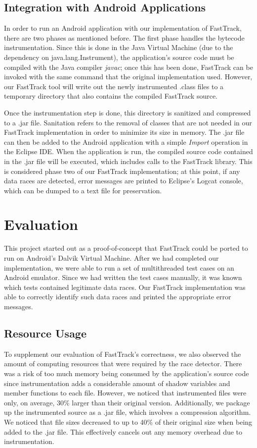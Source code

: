 \documentclass{acm_proc_article-sp}
\begin{document}
\subsection{Integration with Android Applications}
In order to run an Android application with our implementation of FastTrack, there are two phases as mentioned before. The first phase handles the bytecode instrumentation. Since this is done in the Java Virtual Machine (due to the dependency on java.lang.Instrument), the application's source code must be compiled with the Java compiler \emph{javac}; once this has been done, FastTrack can be invoked with the same command that the original implementation used. However, our FastTrack tool will write out the newly instrumented .class files to a temporary directory that also contains the compiled FastTrack source. 

Once the instrumentation step is done, this directory is sanitized and compressed to a .jar file.  Sanitation refers to the removal of classes that are not needed in our FastTrack implementation in order to minimize its size in memory. The .jar file can then be added to the Android application with a simple \emph{Import} operation in the Eclipse IDE. When the application is run, the compiled source code contained in the .jar file will be executed, which includes calls to the FastTrack library. This is considered phase two of our FastTrack implementation; at this point, if any data races are detected, error messages are printed to Eclipse's Logcat console, which can be dumped to a text file for preservation.


\section{Evaluation}
This project started out as a proof-of-concept that FastTrack could be ported to run on Android's Dalvik Virtual Machine. After we had completed our implementation, we were able to run a set of multithreaded test cases on an Android emulator. Since we had written the test cases manually, it was known which tests contained legitimate data races. Our FastTrack implementation was able to correctly identify such data races and printed the appropriate error messages.

\subsection{Resource Usage}
To supplement our evaluation of FastTrack's correctness, we also observed the amount of computing resources that were required by the race detector. There was a risk of too much memory being consumed by the application's source code since instrumentation adds a considerable amount of shadow variables and member functions to each file. However, we noticed that instrumented files were only, on average, 30\% larger than their original version. Additionally, we package up the instrumented source as a .jar file, which involves a compression algorithm. We noticed that file sizes decreased to up to 40\% of their original size when being added to the .jar file. This effectively cancels out any memory overhead due to instrumentation. 
\end{document}
